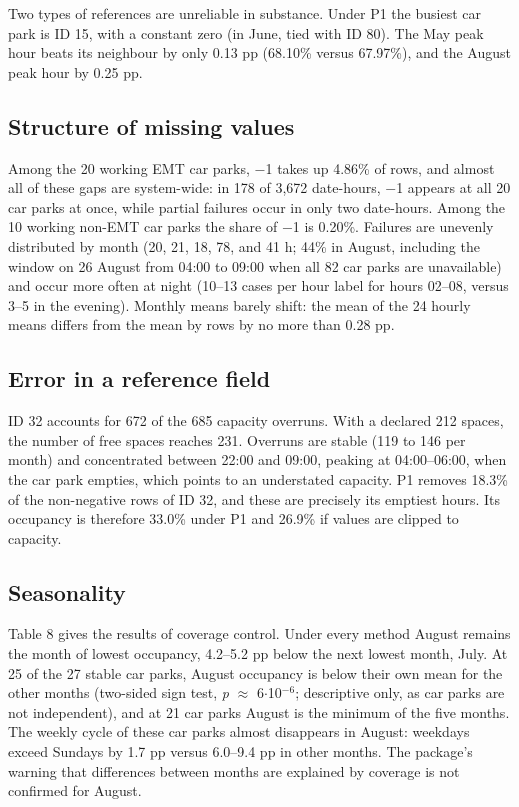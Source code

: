\documentclass[default]{subfiles}
\begin{document}
{Two types of references are unreliable in substance. Under P1 the busiest car park is ID 15, with a constant zero (in June, tied with ID 80). The May peak hour beats its neighbour by only 0.13 pp (68.10\% versus 67.97\%), and the August peak hour by 0.25 pp.

\subsection{Structure of missing values}

Among the 20 working EMT car parks, $-$1 takes up 4.86\% of rows, and almost all of these gaps are system-wide: in 178 of 3,672 date-hours, $-$1 appears at all 20 car parks at once, while partial failures occur in only two date-hours. Among the 10 working non-EMT car parks the share of $-$1 is 0.20\%. Failures are unevenly distributed by month (20, 21, 18, 78, and 41 h; 44\% in August, including the window on 26 August from 04:00 to 09:00 when all 82 car parks are unavailable) and occur more often at night (10--13 cases per hour label for hours 02--08, versus 3--5 in the evening). Monthly means barely shift: the mean of the 24 hourly means differs from the mean by rows by no more than 0.28 pp.

\subsection{Error in a reference field}

ID 32 accounts for 672 of the 685 capacity overruns. With a declared 212 spaces, the number of free spaces reaches 231. Overruns are stable (119 to 146 per month) and concentrated between 22:00 and 09:00, peaking at 04:00--06:00, when the car park empties, which points to an understated capacity. P1 removes 18.3\% of the non-negative rows of ID 32, and these are precisely its emptiest hours. Its occupancy is therefore 33.0\% under P1 and 26.9\% if values are clipped to capacity.

\subsection{Seasonality}

Table 8 gives the results of coverage control. Under every method August remains the month of lowest occupancy, 4.2--5.2 pp below the next lowest month, July. At 25 of the 27 stable car parks, August occupancy is below their own mean for the other months (two-sided sign test, \emph{p} $\approx$ 6$\cdot$10$^{-6}$; descriptive only, as car parks are not independent), and at 21 car parks August is the minimum of the five months. The weekly cycle of these car parks almost disappears in August: weekdays exceed Sundays by 1.7 pp versus 6.0--9.4 pp in other months. The package's warning that differences between months are explained by coverage is not confirmed for August.

}
\end{document}
